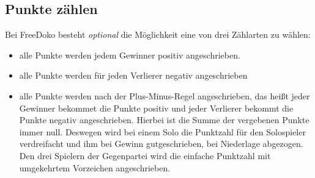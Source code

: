 \documentclass{scrartcl}
\newcommand{\optional}{\textit{optional}\xspace}
\begin{document}
\subsection{Punkte zählen}
Bei FreeDoko besteht \optional die Möglichkeit eine von drei Zählarten zu wählen:
\begin{itemize}
  \item alle Punkte werden jedem Gewinner positiv angeschrieben.
  \item alle Punkte werden für jeden Verlierer negativ angeschrieben
  \item alle Punkte werden nach der Plus-Minus-Regel angeschrieben, das heißt jeder
    Gewinner bekommet die Punkte positiv und jeder Verlierer bekommt die Punkte negativ angeschrieben.  Hierbei ist die Summe der vergebenen Punkte immer null. Deswegen wird bei einem Solo die Punktzahl für den Solospieler verdreifacht und ihm bei Gewinn gutgeschrieben, bei Niederlage abgezogen. Den drei Spielern der Gegenpartei wird die einfache Punktzahl mit umgekehrtem Vorzeichen angeschrieben.
\end{itemize}
\end{document}
